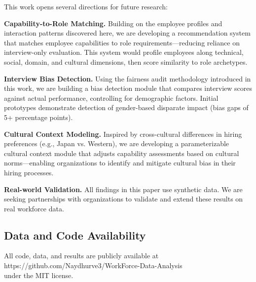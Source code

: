 \documentclass[twocolumn]{article}
\begin{document}
This work opens several directions for future research:

\textbf{Capability-to-Role Matching.} Building on the employee profiles and interaction patterns discovered here, we are developing a recommendation system that matches employee capabilities to role requirements---reducing reliance on interview-only evaluation. This system would profile employees along technical, social, domain, and cultural dimensions, then score similarity to role archetypes.

\textbf{Interview Bias Detection.} Using the fairness audit methodology introduced in this work, we are building a bias detection module that compares interview scores against actual performance, controlling for demographic factors. Initial prototypes demonstrate detection of gender-based disparate impact (bias gaps of 5+ percentage points).

\textbf{Cultural Context Modeling.} Inspired by cross-cultural differences in hiring preferences (e.g., Japan vs. Western), we are developing a parameterizable cultural context module that adjusts capability assessments based on cultural norms---enabling organizations to identify and mitigate cultural bias in their hiring processes.

\textbf{Real-world Validation.} All findings in this paper use synthetic data. We are seeking partnerships with organizations to validate and extend these results on real workforce data.

\subsection*{Data and Code Availability}

All code, data, and results are publicly available at\\
\small https://github.com/Naydhurve3/WorkForce-Data-Analysis\\
under the MIT license.
\end{document}
